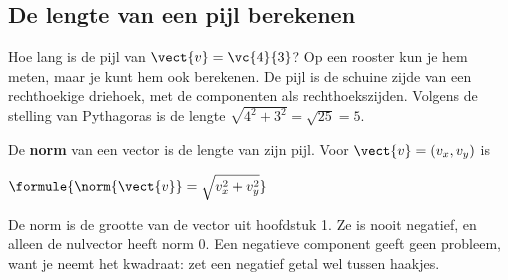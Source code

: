 \subsection{De lengte van een pijl berekenen}

Hoe lang is de pijl van $\vect{v} = \vc{4}{3}$? Op een rooster kun je hem meten, maar je kunt hem ook berekenen. De pijl is de schuine zijde van een rechthoekige driehoek, met de componenten als rechthoekszijden. Volgens de stelling van Pythagoras is de lengte $\sqrt{4^2 + 3^2} = \sqrt{25} = 5$.

\begin{theorie}
\begin{minipage}[t]{.6\linewidth}
\vspace{0pt}
De \textbf{\textcolor{accent}{norm}} van een vector is de lengte van zijn pijl. Voor $\vect{v} = (v_x, v_y)$ is

\vspace{1mm}
\qquad $\formule{\norm{\vect{v}} = \sqrt{v_x^2 + v_y^2}}$
\end{minipage}\hfill
\begin{minipage}[t]{.36\linewidth}
\vspace{1mm}
\centering
{}
\end{minipage}
\end{theorie}

De norm is de grootte van de vector uit hoofdstuk 1. Ze is nooit negatief, en alleen de nulvector heeft norm 0. Een negatieve component geeft geen probleem, want je neemt het kwadraat: zet een negatief getal wel tussen haakjes.



